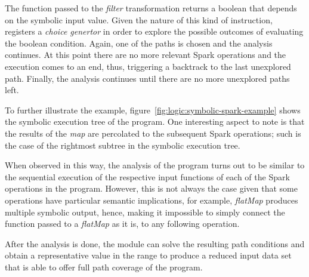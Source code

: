The function passed to the \textit{filter} transformation returns a boolean that depends on the symbolic input value. Given the nature of this kind of instruction, \spf{} registers a \textit{choice genertor} in order to explore the possible outcomes of evaluating the boolean condition. Again, one of the paths is chosen and the analysis continues. At this point there are no more relevant Spark operations and the execution comes to an end, thus, triggering a backtrack to the last unexplored path. Finally, the analysis continues until there are no more unexplored paths left.

To further illustrate the example, figure~\ref{fig:logic:symbolic-spark-example} shows the symbolic execution tree of the program. One interesting aspect to note is that the results of the \textit{map} are percolated to the subsequent Spark operations; such is the case of the rightmost subtree in the symbolic execution tree. 

When observed in this way, the analysis of the program turns out to be similar to the sequential execution of the respective input functions of each of the Spark operations in the program. However, this is not always the case given that some operations have particular semantic implications, for example, \textit{flatMap} produces multiple symbolic output, hence, making it impossible to simply connect the function passed to a \textit{flatMap} as it is, to any following operation.

After the analysis is done, the module can solve the resulting path conditions and obtain a representative value in the range to produce a reduced input data set that is able to offer full path coverage of the program.


